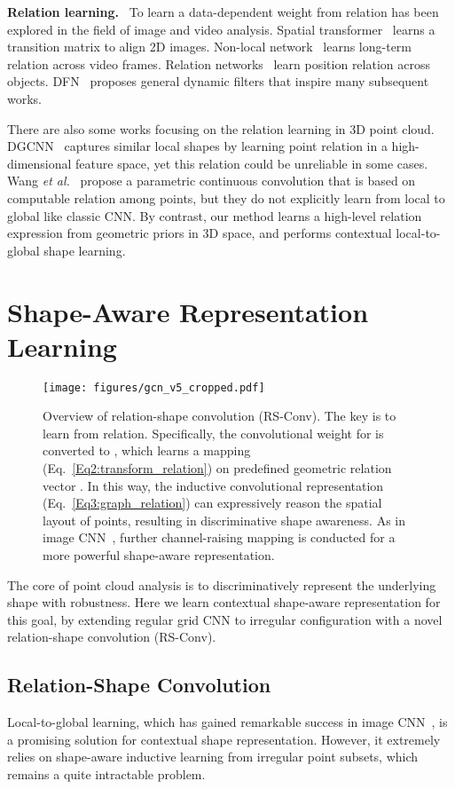 \documentclass[10pt,twocolumn,letterpaper]{article}
\begin{document}
\noindent \textbf{Relation learning.}\,\,~To learn a data-dependent weight from relation has been explored in the field of image and video analysis. Spatial transformer~\cite{stn} learns a transition matrix to align 2D images. Non-local network~\cite{non-local} learns long-term relation across video frames. Relation networks~\cite{relation_detection} learn position relation across objects. DFN~\cite{dfn_net} proposes general dynamic filters that inspire many subsequent works.

There are also some works focusing on the relation learning in 3D point cloud. DGCNN~\cite{c22} captures similar local shapes by learning point relation in a high-dimensional feature space, yet this relation could be unreliable in some cases. Wang \textit{et al.}~\cite{Param_conv} propose a parametric continuous convolution that is based on computable relation among points, but they do not explicitly learn from local to global like classic CNN. By contrast, our method learns a high-level relation expression from geometric priors in 3D space, and performs contextual local-to-global shape learning. 

\vspace{-3pt} 
\section{Shape-Aware Representation Learning}
\label{sec:method}
\begin{figure*}[t]
\centerline{\texttt{[image: figures/gcn\_v5\_cropped.pdf]}}
\caption{Overview of relation-shape convolution (RS-Conv). The key is to learn from relation. Specifically, the convolutional weight for  is converted to , which learns a mapping  (Eq.~\eqref{Eq2:transform_relation}) on predefined geometric relation vector . In this way, the inductive convolutional representation  (Eq.~\eqref{Eq3:graph_relation}) can expressively reason the spatial layout of points, resulting in discriminative shape awareness. As in image CNN~\cite{VGG}, further channel-raising mapping is conducted for a more powerful shape-aware representation.}
\label{fig2:RS-GC}
\end{figure*}

The core of point cloud analysis is to discriminatively represent the underlying shape with robustness. Here we learn contextual shape-aware representation for this goal, by extending regular grid CNN to irregular configuration with a novel relation-shape convolution (RS-Conv).

\subsection{Relation-Shape Convolution}
Local-to-global learning, which has gained remarkable success in image CNN~\cite{alexnet, VGG}, is a promising solution for contextual shape representation. However, it extremely relies on shape-aware inductive learning from irregular point subsets, which remains a quite intractable problem.
\end{document}
